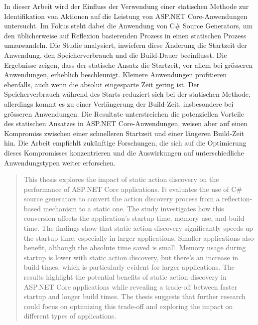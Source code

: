 \begin{zusammenfassung}
In dieser Arbeit wird der Einfluss der Verwendung einer statischen Methode zur Identifikation von Aktionen auf die Leistung von ASP.NET Core-Anwendungen untersucht. Im Fokus steht dabei die Anwendung von C\# Source Generators, um den üblicherweise auf Reflexion basierenden Prozess in einen statischen Prozess umzuwandeln. Die Studie analysiert, inwiefern diese Änderung die Startzeit der Anwendung, den Speicherverbrauch und die Build-Dauer beeinflusst. Die Ergebnisse zeigen, dass der statische Ansatz die Startzeit, vor allem bei grösseren Anwendungen, erheblich beschleunigt. Kleinere Anwendungen profitieren ebenfalls, auch wenn die absolut eingesparte Zeit gering ist. Der Speicherverbrauch während des Starts reduziert sich bei der statischen Methode, allerdings kommt es zu einer Verlängerung der Build-Zeit, insbesondere bei grösseren Anwendungen. Die Resultate unterstreichen die potenziellen Vorteile des statischen Ansatzes in ASP.NET Core-Anwendungen, weisen aber auf einen Kompromiss zwischen einer schnelleren Startzeit und einer längeren Build-Zeit hin. Die Arbeit empfiehlt zukünftige Forschungen, die sich auf die Optimierung dieses Kompromisses konzentrieren und die Auswirkungen auf unterschiedliche Anwendungstypen weiter erforschen.
\end{zusammenfassung}

\begin{abstract}
This thesis explores the impact of static action discovery on the performance of ASP.NET Core applications. It evaluates the use of C\# source generators to convert the action discovery process from a reflection-based mechanism to a static one. The study investigates how this conversion affects the application's startup time, memory use, and build time. The findings show that static action discovery significantly speeds up the startup time, especially in larger applications. Smaller applications also benefit, although the absolute time saved is small. Memory usage during startup is lower with static action discovery, but there's an increase in build times, which is particularly evident for larger applications. The results highlight the potential benefits of static action discovery in ASP.NET Core applications while revealing a trade-off between faster startup and longer build times. The thesis suggests that further research could focus on optimizing this trade-off and exploring the impact on different types of applications.
\end{abstract}